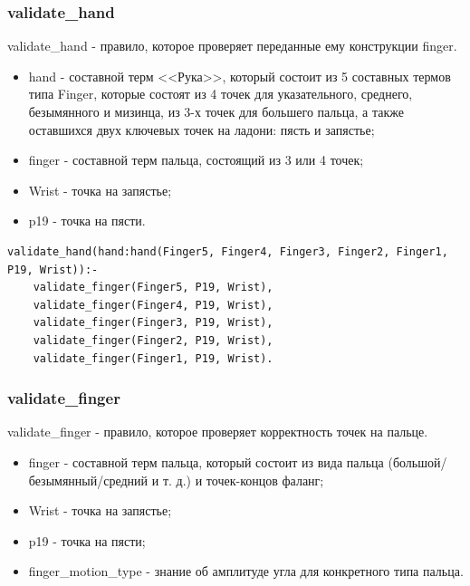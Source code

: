 \subsubsection{validate\_hand}
\hspace{0.6cm} validate\_hand - правило, которое проверяет переданные ему конструкции finger.

\begin{itemize}
	\item hand - составной терм <<Рука>>, который состоит из 5 составных термов типа Finger, которые состоят из 4 точек для указательного, среднего, безымянного и мизинца, из 3-х точек для большего пальца, а также оставшихся двух ключевых точек на ладони: пясть и запястье;
	\item finger - составной терм пальца, состоящий из 3 или 4 точек;
	\item Wrist - точка на запястье;
	\item p19 - точка на пясти.
\end{itemize}

\begin{lstlisting}[caption=Реализация правила validate\_hand, label=rules:validatehand]
validate_hand(hand:hand(Finger5, Finger4, Finger3, Finger2, Finger1, P19, Wrist)):-
	validate_finger(Finger5, P19, Wrist),
	validate_finger(Finger4, P19, Wrist),
	validate_finger(Finger3, P19, Wrist),
	validate_finger(Finger2, P19, Wrist),
	validate_finger(Finger1, P19, Wrist).
\end{lstlisting}

\subsubsection{validate\_finger}
\hspace{0.6cm} validate\_finger - правило, которое проверяет корректность точек на пальце.

\begin{itemize}
	\item finger - составной терм пальца, который состоит из вида пальца (большой/безымянный/средний и т. д.) и точек-концов фаланг;
	\item Wrist - точка на запястье;
	\item p19 - точка на пясти;
	\item finger\_motion\_type - знание об амплитуде угла для конкретного типа пальца.
\end{itemize}

